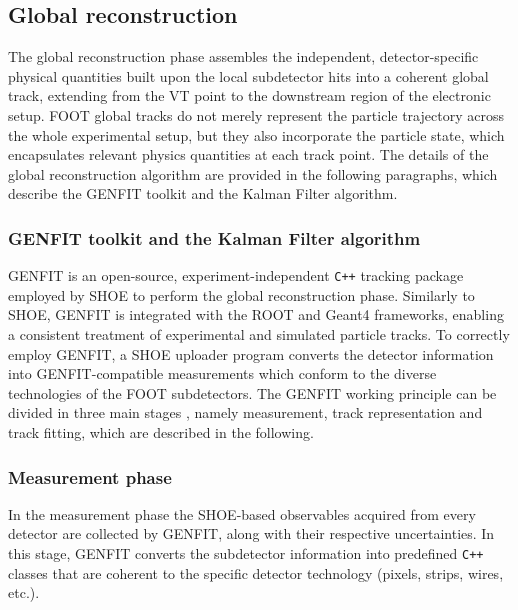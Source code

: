 \subsection{Global reconstruction}\label{ssec:global_reconstruction}
The global reconstruction phase assembles the independent, detector-specific physical quantities built upon the local subdetector hits into a coherent global track, extending from the VT point to the downstream region of the electronic setup. FOOT global tracks do not merely represent the particle trajectory across the whole experimental setup, but they also incorporate the particle state, which encapsulates relevant physics quantities at each track point. The details of the global reconstruction algorithm are provided in the following paragraphs, which describe the GENFIT toolkit and the Kalman Filter algorithm.
\subsubsection{GENFIT toolkit and the Kalman Filter algorithm}\label{sssec:genfit_kalman_filter}
GENFIT \cite{Rauch_2015} is an open-source, experiment-independent \texttt{C++} tracking package employed by SHOE to perform the global reconstruction phase. Similarly to SHOE, GENFIT is integrated with the ROOT and Geant4 frameworks, enabling a consistent treatment of experimental and simulated particle tracks. To correctly employ GENFIT, a SHOE uploader program converts the detector information into GENFIT-compatible measurements which conform to the diverse technologies of the FOOT subdetectors. The GENFIT working principle can be divided in three main stages \cite{UbaldiPhDThesis}, namely measurement, track representation and track fitting, which are described in the following.
\subsubsection{Measurement phase}\label{sssec:meas_phase}
In the measurement phase the SHOE-based observables acquired from every detector are collected by GENFIT, along with their respective uncertainties. In this stage, GENFIT converts the subdetector information into predefined \texttt{C++} classes that are coherent to the specific detector technology (pixels, strips, wires, etc.).
